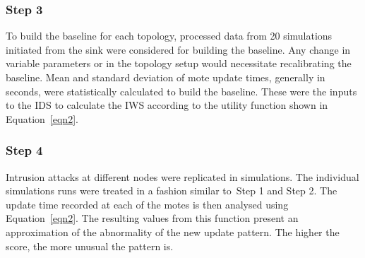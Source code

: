 \documentclass[conference,manuscript]{IEEEtran}
\newcommand{\notedme}[1]{\raisebox{0pt}[0pt][0pt]{\pdfcomment[open=true,color=blue]{#1}}}
\begin{document}
\subsubsection*{Step 3} 
To build the baseline for each topology, processed data from 20 simulations initiated from the sink were considered for building the baseline.
Any change in variable parameters or in the topology setup would necessitate recalibrating the baseline.
Mean and standard deviation of mote update times, generally in seconds, were statistically calculated to build the baseline.
These were the inputs to the IDS to calculate the IWS according to the utility function shown in Equation~\ref{eqn2}. 


\subsubsection*{Step 4} 
Intrusion attacks at different nodes were replicated in simulations.
The individual simulations runs were treated in a fashion  similar to~Step 1 and Step 2.
The update time recorded at each of the motes is then analysed using Equation~\ref{eqn2}.
The resulting values from this function present an approximation of the abnormality of the new update pattern. The higher the score, the more unusual the pattern is. 
\end{document}

